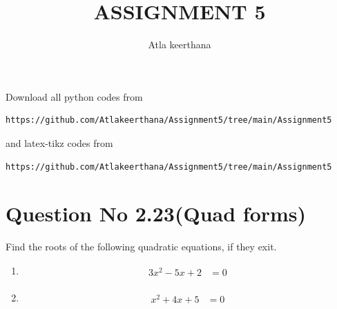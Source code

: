 \documentclass[journal,12pt,twocolumn]{IEEEtran}
\begin{document}
     \def\rightbox#1{\makebox[0in][r]{#1}}
     \def\centbox#1{\makebox[0in]{#1}}
     \def\topbox#1{\raisebox{-\baselineskip}[0in][0in]{#1}}
     \def\midbox#1{\raisebox{-0.5\baselineskip}[0in][0in]{#1}}
\vspace{3cm}
\title{ASSIGNMENT 5}
\author{Atla keerthana}
\maketitle
\newpage
\bigskip
\renewcommand{\thefigure}{\theenumi}
\renewcommand{\thetable}{\theenumi}
Download all python codes from 
\begin{lstlisting}
https://github.com/Atlakeerthana/Assignment5/tree/main/Assignment5
\end{lstlisting}
%
and latex-tikz codes from 
%
\begin{lstlisting}
https://github.com/Atlakeerthana/Assignment5/tree/main/Assignment5
\end{lstlisting}
%
\section{Question No 2.23(Quad forms)}
Find the roots of the following quadratic equations, if they exit.
%
\begin{enumerate}
\item
\begin{align}
\begin{split}
3x^2-5x+2&=0 \label{1.0.1}
\end{split}
\end{align}
\item
\begin{align}
\begin{split}
x^2+4x+5&=0 \label{1.0.2}
\end{split}
\end{align}
\end{enumerate}
%
\end{document}
